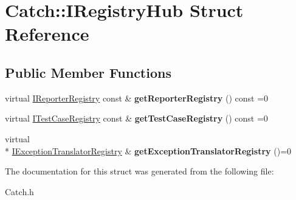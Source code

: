 \hypertarget{struct_catch_1_1_i_registry_hub}{\section{Catch\-:\-:I\-Registry\-Hub Struct Reference}
\label{struct_catch_1_1_i_registry_hub}
}
\subsection*{Public Member Functions}
\begin{DoxyCompactItemize}
\item 
\hypertarget{struct_catch_1_1_i_registry_hub_a55534563f7ecf7e20ec1e37285ebe54d}{virtual \hyperlink{struct_catch_1_1_i_reporter_registry}{I\-Reporter\-Registry} const \& {\bfseries get\-Reporter\-Registry} () const =0}\label{struct_catch_1_1_i_registry_hub_a55534563f7ecf7e20ec1e37285ebe54d}

\item 
\hypertarget{struct_catch_1_1_i_registry_hub_af4f6255f0c0f8f1f179fa9d7d4843076}{virtual \hyperlink{struct_catch_1_1_i_test_case_registry}{I\-Test\-Case\-Registry} const \& {\bfseries get\-Test\-Case\-Registry} () const =0}\label{struct_catch_1_1_i_registry_hub_af4f6255f0c0f8f1f179fa9d7d4843076}

\item 
\hypertarget{struct_catch_1_1_i_registry_hub_a3606988da110c016c5af3ae63454eb78}{virtual \\*
\hyperlink{struct_catch_1_1_i_exception_translator_registry}{I\-Exception\-Translator\-Registry} \& {\bfseries get\-Exception\-Translator\-Registry} ()=0}\label{struct_catch_1_1_i_registry_hub_a3606988da110c016c5af3ae63454eb78}

\end{DoxyCompactItemize}


The documentation for this struct was generated from the following file\-:\begin{DoxyCompactItemize}
\item 
Catch.\-h\end{DoxyCompactItemize}

